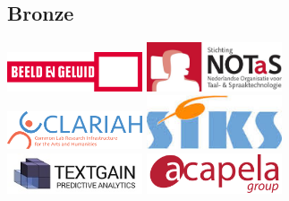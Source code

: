 \subsection{Bronze}
\begin{center}
    \includegraphics[width=0.3\textwidth]{logo_beeld_geluid} \hspace{2cm}
    \includegraphics[width=0.3\textwidth]{logo_NOTaS} \\[2cm]
    \includegraphics[width=0.3\textwidth]{logo_clariah} \hspace{2cm}
    \includegraphics[width=0.3\textwidth]{siks-logo} \\[2cm]
    \includegraphics[width=0.3\textwidth]{textgainlogo} \hspace{2cm}
    \includegraphics[width=0.3\textwidth]{logoAG_XL}
\end{center}
